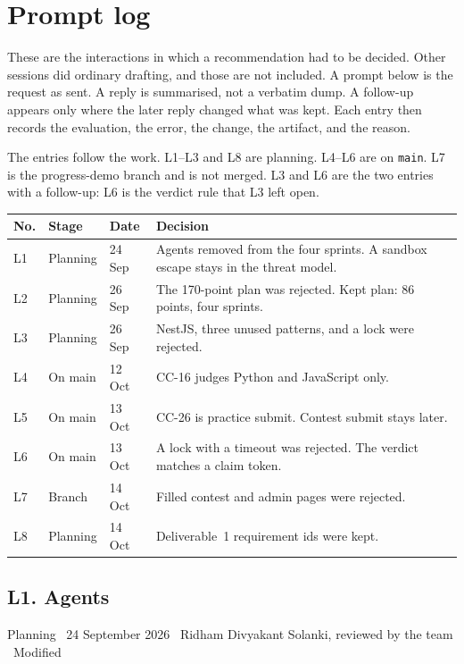 \documentclass[11pt,a4paper]{article}
\newcommand{\meta}[1]{{\footnotesize\color{quiet}#1}\par\vspace{0.2em}}
\begin{document}
\section{Prompt log}

These are the interactions in which a recommendation had to be decided. Other sessions did ordinary drafting, and those are not included. A prompt below is the request as sent. A reply is summarised, not a verbatim dump. A follow-up appears only where the later reply changed what was kept. Each entry then records the evaluation, the error, the change, the artifact, and the reason.

The entries follow the work. L1--L3 and L8 are planning. L4--L6 are on \texttt{main}. L7 is the progress-demo branch and is not merged. L3 and L6 are the two entries with a follow-up: L6 is the verdict rule that L3 left open.

\begin{center}
\small
\begin{tabularx}{\textwidth}{@{}l l l Y@{}}
\toprule
{} No. & Stage & Date & Decision \\
\midrule
L1 & Planning & 24 Sep & Agents removed from the four sprints. A sandbox escape stays in the threat model. \\
L2 & Planning & 26 Sep & The 170-point plan was rejected. Kept plan: 86 points, four sprints. \\
L3 & Planning & 26 Sep & NestJS, three unused patterns, and a lock were rejected. \\
L4 & On main & 12 Oct & CC-16 judges Python and JavaScript only. \\
L5 & On main & 13 Oct & CC-26 is practice submit. Contest submit stays later. \\
L6 & On main & 13 Oct & A lock with a timeout was rejected. The verdict matches a claim token. \\
L7 & Branch & 14 Oct & Filled contest and admin pages were rejected. \\
L8 & Planning & 14 Oct & Deliverable~1 requirement ids were kept. \\
\bottomrule
\end{tabularx}
\end{center}

\subsection{L1. Agents}
\meta{Planning \textperiodcentered\ 24 September 2026 \textperiodcentered\ Ridham Divyakant Solanki, reviewed by the team \textperiodcentered\ Modified}
\end{document}
